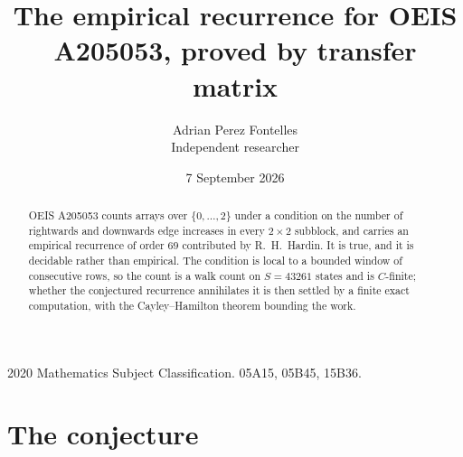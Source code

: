 \documentclass[11pt,a4paper]{article}
\title{The empirical recurrence for OEIS A205053, proved by transfer matrix}
\author{Adrian Perez Fontelles\\ \small Independent researcher}
\date{7 September 2026}
\theoremstyle{plain}
\theoremstyle{definition}
\begin{document}
\maketitle

\begin{abstract}
OEIS A205053 counts arrays over $\{0,\dots,2\}$ under a condition on the number of rightwards and downwards edge increases
in every $2\times2$ subblock, and carries an empirical recurrence of order $69$ contributed by
R.~H.~Hardin. It is true, and it is decidable rather than empirical. The condition is local to
a bounded window of consecutive rows, so the count is a walk count on $S=43261$ states and is
$C$-finite; whether the conjectured recurrence annihilates it is then settled by a finite exact
computation, with the Cayley--Hamilton theorem bounding the work.
\end{abstract}

\noindent\small 2020 Mathematics Subject Classification. 05A15, 05B45, 15B36.\normalsize

\section{The conjecture}
\end{document}
